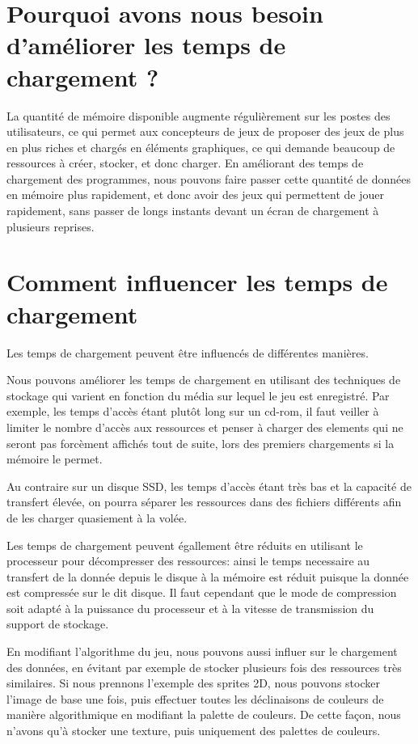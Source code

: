 \documentclass[a4paper, 11pt]{article} %
\begin{document}
\section*{Pourquoi avons nous besoin d'améliorer les temps de chargement ?}
La quantité de mémoire disponible augmente régulièrement sur les postes des utilisateurs, ce qui permet aux concepteurs de jeux de proposer des jeux de plus en plus riches et chargés en éléments graphiques, ce qui demande beaucoup de ressources à créer, stocker, et donc charger. En améliorant des temps de chargement des programmes, nous pouvons faire passer cette quantité de données en mémoire plus rapidement, et donc avoir des jeux qui permettent de jouer rapidement, sans passer de longs instants devant un écran de chargement à plusieurs reprises.

\section*{Comment influencer les temps de chargement}
Les temps de chargement peuvent être influencés de différentes manières.

Nous pouvons améliorer les temps de chargement en utilisant des techniques de stockage qui varient en fonction du média sur lequel le jeu est enregistré. Par exemple, les temps d'accès étant plutôt long sur un cd-rom, il faut veiller à limiter le nombre d'accès aux ressources et penser à charger des elements qui ne seront pas forcèment affichés tout de suite, lors des premiers chargements si la mémoire le permet.

Au contraire sur un disque SSD, les temps d'accès étant très bas et la capacité de transfert élevée, on pourra séparer les ressources dans des fichiers différents afin de les charger quasiement à la volée.

Les temps de chargement peuvent égallement être réduits en utilisant le processeur pour décompresser des ressources: ainsi le temps necessaire au transfert de la donnée depuis le disque à la mémoire est réduit puisque la donnée est compressée sur le dit disque. Il faut cependant que le mode de compression soit adapté à la puissance du processeur et à la vitesse de transmission du support de stockage.

\newpage
En modifiant l'algorithme du jeu, nous pouvons aussi influer sur le chargement des données, en évitant par exemple de stocker plusieurs fois des ressources très similaires. Si nous prennons l'exemple des sprites 2D, nous pouvons stocker l'image de base une fois, puis effectuer toutes les déclinaisons de couleurs de manière algorithmique en modifiant la palette de couleurs. De cette façon, nous n'avons qu'à stocker une texture, puis uniquement des palettes de couleurs.
\end{document}
